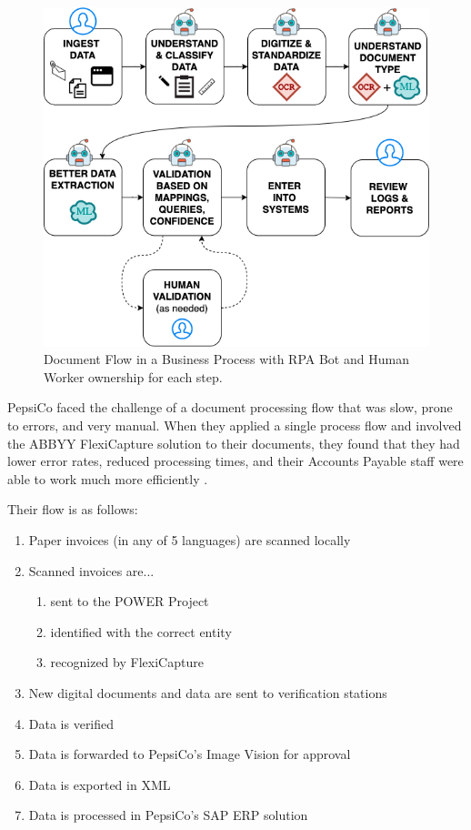 \documentclass[conference]{IEEEtran}
\begin{document}
\begin{figure}[ht]
\centerline{\includegraphics[width=\columnwidth]{BotFlow.png}}
\caption{Document Flow in a Business Process with RPA Bot and Human Worker ownership for each step.}
\label{figBotFlow}
\end{figure}

PepsiCo faced the challenge of a document processing flow that was slow, prone to errors, and very manual. When they applied a single process flow and involved the ABBYY FlexiCapture solution to their documents, they found that they had lower error rates, reduced processing times, and their Accounts Payable staff were able to work much more efficiently \cite{pepsico}.

Their flow is as follows:
\begin{enumerate}
\item Paper invoices (in any of 5 languages) are scanned locally
\item Scanned invoices are...
    \begin{enumerate}
        \item sent to the POWER Project
        \item identified with the correct entity
        \item recognized by FlexiCapture
    \end{enumerate}
\item New digital documents and data are sent to verification stations
\item Data is verified
\item Data is forwarded to PepsiCo's Image Vision for approval
\item Data is exported in XML
\item Data is processed in PepsiCo's SAP ERP solution
\end{enumerate}
\end{document}
